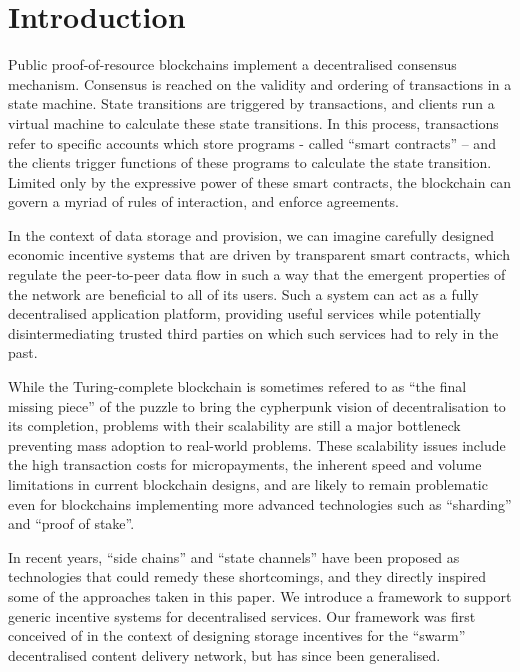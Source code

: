 
\section{Introduction}
Public proof-of-resource blockchains implement a decentralised consensus mechanism. Consensus is reached on the validity and ordering of
transactions in a state machine. State transitions are triggered by transactions, and clients run a virtual machine to calculate these state transitions. In this process, transactions refer to specific accounts which store programs - called ``smart contracts'' -- and the clients trigger functions of these programs to calculate the state transition. Limited only by the expressive power of these smart contracts, the blockchain can govern a myriad of rules of interaction, and enforce agreements.

In the context of data storage and provision, we can imagine carefully designed economic incentive systems that are driven by transparent smart contracts, which regulate the peer-to-peer data flow in such a way that the emergent properties of the network are beneficial to all of its users.
Such a system can act as a fully decentralised application platform, providing useful services while potentially
disintermediating trusted third parties on which such services had to rely in the past.

While the Turing-complete blockchain is sometimes refered to as ``the final missing piece'' of the puzzle to bring the cypherpunk vision
of decentralisation to its completion, problems with their scalability are still a major bottleneck preventing mass adoption to real-world problems. These scalability issues include the high transaction costs for micropayments, the inherent speed and volume limitations in current blockchain designs, and are likely to remain problematic even for blockchains implementing more advanced technologies such as ``sharding'' and ``proof of stake''.

In recent years, ``side chains'' and ``state channels'' have been proposed as technologies that could remedy these shortcomings, and they directly inspired some of the approaches taken in this paper.
We introduce a framework to support generic incentive systems for decentralised services. Our framework was first conceived of in the context of designing storage incentives for the ``swarm'' decentralised content delivery network, but has since been generalised.

